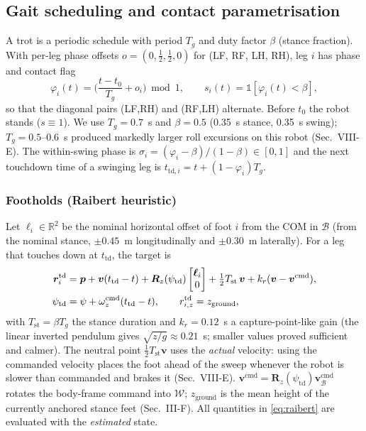 \documentclass[11pt]{article}
\newcommand{\R}{\mathbb{R}}
\newcommand{\bp}{\bm{p}}\newcommand{\bv}{\bm{v}}\newcommand{\bom}{\bm{\omega}}\newcommand{\bth}{\bm{\theta}}
\newcommand{\Rot}{\bm{R}}\newcommand{\Tm}{\bm{T}}\newcommand{\I}{\bm{I}}
\begin{document}
\subsection{Gait scheduling and contact parametrisation}
A trot is a periodic schedule with period $T_g$ and duty factor $\beta$ (stance fraction). With per-leg phase offsets $o=(0,\tfrac12,\tfrac12,0)$ for (LF, RF, LH, RH), leg $i$ has phase and contact flag
\begin{equation}
\varphi_i(t)=\Big(\frac{t-t_0}{T_g}+o_i\Big)\bmod 1,\qquad s_i(t)=\mathbb 1[\varphi_i(t)<\beta],
\label{eq:gait}
\end{equation}
so that the diagonal pairs (LF,RH) and (RF,LH) alternate. Before $t_0$ the robot stands ($s\equiv1$). We use $T_g=0.7$~s and $\beta=0.5$ (0.35~s stance, 0.35~s swing); $T_g=0.5$--$0.6$~s produced markedly larger roll excursions on this robot (Sec.~VIII-E). The within-swing phase is $\sigma_i=(\varphi_i-\beta)/(1-\beta)\in[0,1]$ and the next touchdown time of a swinging leg is $t_{\mathrm{td},i}=t+(1-\varphi_i)T_g$.

\subsubsection{Footholds (Raibert heuristic)}
Let $\bm\ell_i\in\R^2$ be the nominal horizontal offset of foot $i$ from the COM in $\mathcal B$ (from the nominal stance, $\pm0.45$~m longitudinally and $\pm0.30$~m laterally). For a leg that touches down at $t_{\mathrm{td}}$, the target is
\begin{equation}
\begin{aligned}
\br_i^{\mathrm{td}} &= \bp + \bv(t_{\mathrm{td}}-t) + \Rot_z(\psi_{\mathrm{td}})\begin{bmatrix}\bm\ell_i\\0\end{bmatrix}
+ \tfrac12 T_{\mathrm{st}}\,\bv + k_r(\bv-\bv^{\mathrm{cmd}}),\\
\psi_{\mathrm{td}} &= \psi+\omega^{\mathrm{cmd}}_z(t_{\mathrm{td}}-t),\qquad r^{\mathrm{td}}_{i,z}=z_{\mathrm{ground}},
\end{aligned}
\label{eq:raibert}
\end{equation}
with $T_{\mathrm{st}}=\beta T_g$ the stance duration and $k_r=0.12$~s a capture-point-like gain (the linear inverted pendulum gives $\sqrt{z/g}\approx0.21$~s; smaller values proved sufficient and calmer). The neutral point $\tfrac12T_{\mathrm{st}}\bv$ uses the \emph{actual} velocity: using the commanded velocity places the foot ahead of the sweep whenever the robot is slower than commanded and brakes it (Sec.~VIII-E). $\bv^{\mathrm{cmd}}=\Rot_z(\psi_{\mathrm{td}})\bv^{\mathrm{cmd}}_{\mathcal B}$ rotates the body-frame command into $\mathcal W$; $z_{\mathrm{ground}}$ is the mean height of the currently anchored stance feet (Sec.~III-F). All quantities in \eqref{eq:raibert} are evaluated with the \emph{estimated} state.
\end{document}
